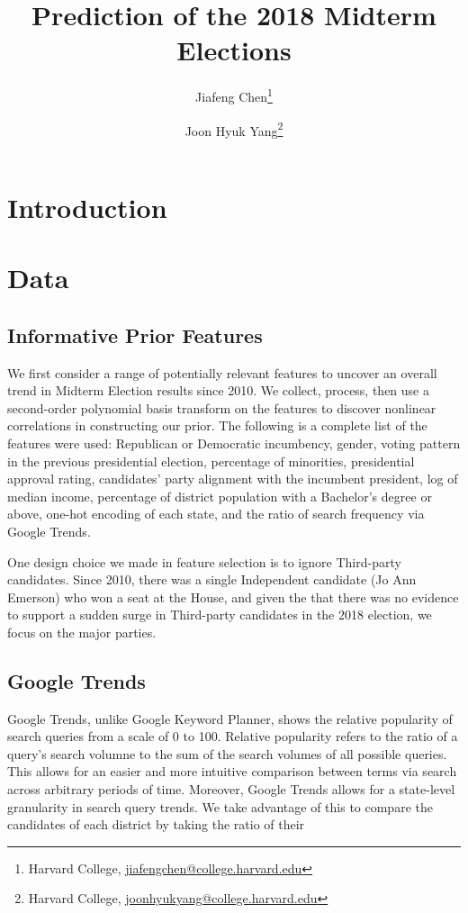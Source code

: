 \documentclass[11pt]{article}
\title{\sffamily\bfseries{Prediction of the 2018 Midterm Elections}}
\author{Jiafeng Chen\thanks{Harvard College, \url{jiafengchen@college.harvard.edu}} \and Joon Hyuk Yang\thanks{Harvard College, \url{joonhyukyang@college.harvard.edu}}}
\begin{document}
\maketitle
\section{Introduction}

\section{Data}
\subsection{Informative Prior Features}
We first consider a range of potentially relevant features to uncover an overall trend in Midterm Election results since 2010. We collect, process, then use a second-order polynomial basis transform on the features to discover nonlinear correlations in constructing our prior. The following is a complete list of the features were used: Republican or Democratic incumbency, gender, voting pattern in the previous presidential election, percentage of minorities, presidential approval rating, candidates’ party alignment with the incumbent president, log of median income, percentage of district population with a Bachelor’s degree or above, one-hot encoding of each state, and the ratio of search frequency via Google Trends.

One design choice we made in feature selection is to ignore Third-party candidates. Since 2010, there was a single Independent candidate (Jo Ann Emerson) who won a seat at the House, and given the that there was no evidence to support a sudden surge in Third-party candidates in the 2018 election, we focus on the major parties.   

\subsection{Google Trends}
Google Trends, unlike Google Keyword Planner, shows the relative popularity of search queries from a scale of 0 to 100. Relative popularity refers to the ratio of a query's search volumne to the sum of the search volumes of all possible queries. This allows for an easier and more intuitive comparison between terms via search across arbitrary periods of time. Moreover, Google Trends allows for a state-level granularity in search query trends. We take advantage of this to compare the candidates of each district by taking the ratio of their 
\end{document}

